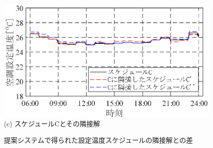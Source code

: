 \begin{figure}[htbp]
\begin{center}
\begin{minipage}{0.5\textwidth}
\begin{center}
        \includegraphics[width=1.0\textwidth,keepaspectratio=true]{fig/sim_result_schedule_c_settemp_diff.eps}\\{(c) スケジュールCとその隣接解}
      \end{center}
    \end{minipage}
  \end{center}
  \vspace{-2mm}
  \caption{提案システムで得られた設定温度スケジュールの隣接解との差}
  \label{fig::sim_result_schedule_settemp_diff}
\end{figure}

